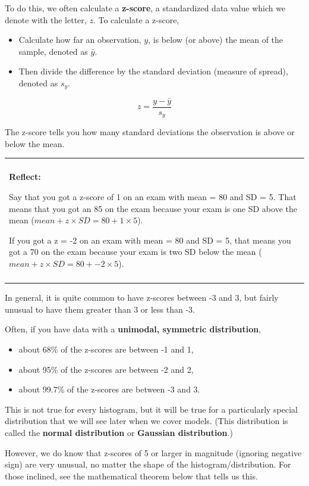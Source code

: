\documentclass[]{book}
\providecommand{\tightlist}{%
  \setlength{\itemsep}{0pt}\setlength{\parskip}{0pt}}
\newenvironment{reflect}
{
    \begin{center}
    
    \begin{tabular}{|p{0.8\textwidth}|}
    \rowcolor{LightBlue}
    \hline\\
    \rowcolor{LightBlue}
    \textbf{Reflect:}
}
{
    \\\rowcolor{LightBlue}
    \\\hline
    \end{tabular} 
    \end{center}
}
\begin{document}
To do this, we often calculate a \textbf{z-score}, a standardized data value which we denote with the letter, \(z\). To calculate a z-score,

\begin{itemize}
\tightlist
\item
  Calculate how far an observation, \(y\), is below (or above) the mean of the sample, denoted as \(\bar{y}\).
\item
  Then divide the difference by the standard deviation (measure of spread), denoted as \(s_y\).
\end{itemize}

\[ z = \frac{y - \bar{y}}{s_y} \]

The z-score tells you how many standard deviations the observation is above or below the mean.

\begin{reflect}
Say that you got a z-score of 1 on an exam with mean = 80 and SD = 5.
That means that you got an 85 on the exam because your exam is one SD
above the mean (\(mean + z \times SD = 80 + 1 \times 5\)).

If you got a z = -2 on an exam with mean = 80 and SD = 5, that means you
got a 70 on the exam because your exam is two SD below the mean
(\(mean + z \times SD = 80 + -2 \times 5\)).
\end{reflect}

In general, it is quite common to have z-scores between -3 and 3, but fairly unusual to have them greater than 3 or less than -3.

Often, if you have data with a \textbf{unimodal, symmetric distribution},

\begin{itemize}
\tightlist
\item
  about 68\% of the z-scores are between -1 and 1,
\item
  about 95\% of the z-scores are between -2 and 2,
\item
  about 99.7\% of the z-scores are between -3 and 3.
\end{itemize}

This is not true for every histogram, but it will be true for a particularly special distribution that we will see later when we cover models. (This distribution is called the \textbf{normal distribution} or \textbf{Gaussian distribution}.)

However, we do know that z-scores of 5 or larger in magnitude (ignoring negative sign) are very unusual, no matter the shape of the histogram/distribution. For those inclined, see the mathematical theorem below that tells us this.
\end{document}
